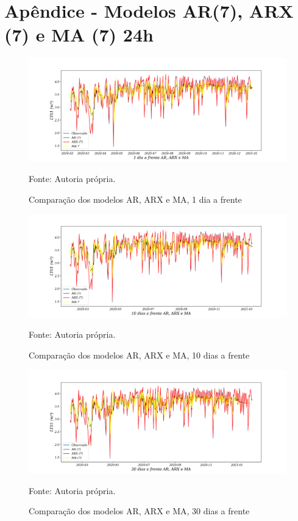 
\section{Apêndice - Modelos AR(7), ARX (7) e MA (7) 24h }\label{sec:ararxma24}

\begin{figure}[H]
	\centering
	\caption{Comparação dos modelos AR, ARX e MA, 1 dia a frente }
	\label{fig:1-AR-ARX-MA24}
	\includegraphics[width=1\linewidth]{Apendices/Figuras/modelagem-24h/1-AR-ARX-MA}
	
	Fonte: Autoria própria.
\end{figure}

\begin{figure}[H]
	\centering
	\caption{Comparação dos modelos AR, ARX e MA, 10 dias a frente }
	\label{fig:10-AR-ARX-MA24}
	\includegraphics[width=1\linewidth]{Apendices/Figuras/modelagem-24h/10-AR-ARX-MA}
	
	Fonte: Autoria própria.
\end{figure}


\begin{figure}[H]
	\centering
	\caption{Comparação dos modelos AR, ARX e MA, 30 dias a frente }
	\label{fig:30-AR-ARX-MA24}
	\includegraphics[width=1\linewidth]{Apendices/Figuras/modelagem-24h/30-AR-ARX-MA}
	
	Fonte: Autoria própria.
\end{figure}

